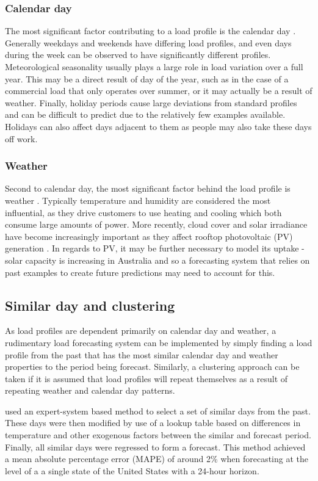 \subsubsection{Calendar day}
The most significant factor contributing to a load profile is the calendar day \citep{Weron2006}.
Generally weekdays and weekends have differing load profiles, and even days during the week can be observed to have significantly different profiles.
Meteorological seasonality usually plays a large role in load variation over a full year.
This may be a direct result of day of the year, such as in the case of a commercial load that only operates over summer, or it may actually be a result of weather.
Finally, holiday periods cause large deviations from standard profiles and can be difficult to predict due to the relatively few examples available.
Holidays can also affect days adjacent to them as people may also take these days off work.

\subsubsection{Weather}
Second to calendar day, the most significant factor behind the load profile is weather \citep{Hippert2001}.
Typically temperature and humidity are considered the most influential, as they drive customers to use heating and cooling which both consume large amounts of power.
More recently, cloud cover and solar irradiance have become increasingly important as they affect rooftop photovoltaic (PV) generation \cite{AEMO2017}.
In regards to PV, it may be further necessary to model its uptake - solar capacity is increasing in Australia \citep{Jacobs2017} and so a forecasting system that relies on past examples to create future predictions may need to account for this.

\subsection{Similar day and clustering}
As load profiles are dependent primarily on calendar day and weather, a rudimentary load forecasting system can be implemented by simply finding a load profile from the past that has the most similar calendar day and weather properties to the period being forecast. 
Similarly, a clustering approach can be taken if it is assumed that load profiles will repeat themselves as a result of repeating weather and calendar day patterns.

\citet{Rahman1993} used an expert-system based method to select a set of similar days from the past. 
These days were then modified by use of a lookup table based on differences in temperature and other exogenous factors between the similar and forecast period.
Finally, all similar days were regressed to form a forecast.
This method achieved a mean absolute percentage error (MAPE) of around 2\% when forecasting at the level of a a single state of the United States with a 24-hour horizon.

